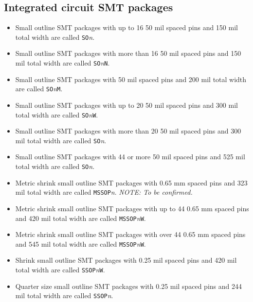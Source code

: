 \documentclass{article}
\begin{document}
\subsection{Integrated circuit SMT packages}
\begin{itemize}
\item   Small outline SMT packages with up to 16 50 mil spaced pins and
	150 mil total width are called {\tt SO}{\it n}.

\item   Small outline SMT packages with more than 16 50 mil spaced pins
	and 150 mil total width are called {\tt SO}{\it n}{\tt N}.

\item   Small outline SMT packages with 50 mil spaced pins and 200 mil
	total width are called {\tt SO}{\it n}{\tt M}.

\item   Small outline SMT packages with up to 20 50 mil spaced pins and
	300 mil total width are called {\tt SO}{\it n}{\tt W}.

\item   Small outline SMT packages with more than 20 50 mil spaced pins
	and 300 mil total width are called {\tt SO}{\it n}.

\item   Small outline SMT packages with 44 or more 50 mil spaced pins
	and 525 mil total width are called {\tt SO}{\it n}.

\item   Metric shrink small outline SMT packages with 0.65 mm spaced
	pins and 323 mil total width are called {\tt MSSOP}{\it n}. 
	{\it NOTE: To be confirmed.}

\item   Metric shrink small outline SMT packages with up to 44 0.65 mm
	spaced pins and 420 mil total width are called 
	{\tt MSSOP}{\it n}{\tt W}.

\item   Metric shrink small outline SMT packages with over 44 0.65 mm
	spaced pins and 545 mil total width are called 
	{\tt MSSOP}{\it n}{\tt W}.

\item   Shrink small outline SMT packages with 0.25 mil spaced pins and
	420 mil total width are called {\tt SSOP}{\it n}{\tt W}.

\item   Quarter size small outline SMT packages with 0.25 mil spaced
	pins and 244 mil total width are called {\tt SSOP}{\it n}.


\end{itemize}
\end{document}
